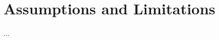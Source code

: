 \documentclass[a4paper, 12pt]{article}
\begin{document}
\section{Assumptions and Limitations}
...
\end{document}

